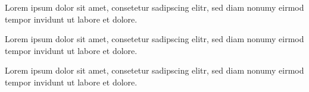 \begin{frame}
    \frametitle{}
    \framesubtitle{}

    \vspace*{-2mm}

    \begin{block}{}
        Lorem ipsum dolor sit amet, consetetur sadipscing elitr, sed diam nonumy eirmod tempor invidunt ut labore et dolore.
    \end{block}

    \begin{alertblock}{}
        Lorem ipsum dolor sit amet, consetetur sadipscing elitr, sed diam nonumy eirmod tempor invidunt ut labore et dolore.
    \end{alertblock}

    \begin{exampleblock}{}
        Lorem ipsum dolor sit amet, consetetur sadipscing elitr, sed diam nonumy eirmod tempor invidunt ut labore et dolore.
    \end{exampleblock}
\end{frame}